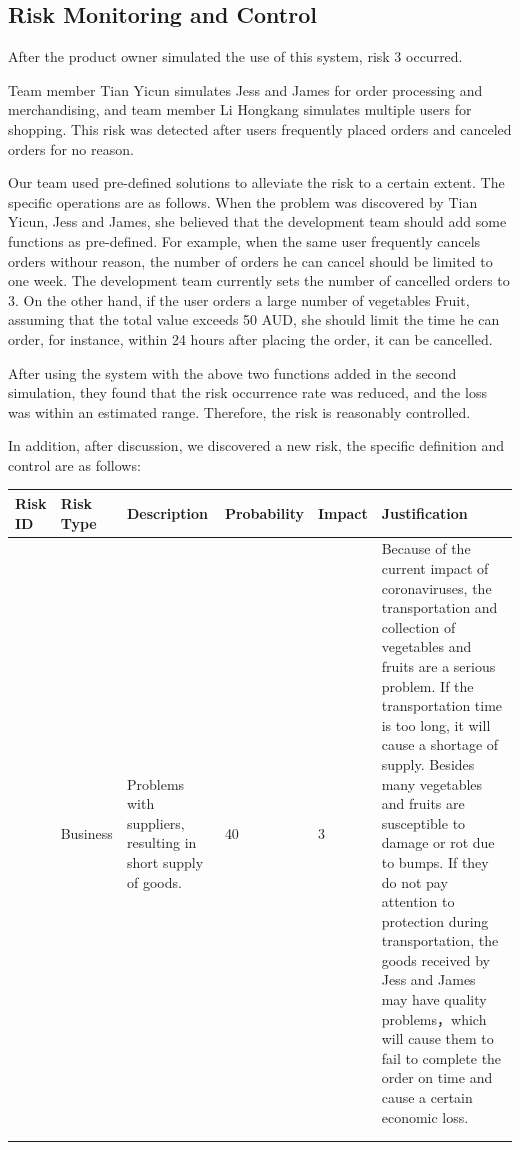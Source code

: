 \clearpage
\subsection{Risk Monitoring and Control}
\label{sub:riskMonitoringandControl2}
After the product owner simulated the use of this system, risk 3 occurred.

Team member Tian Yicun simulates Jess and James for order processing and merchandising, and team member Li Hongkang simulates multiple users for shopping. This risk was detected after users frequently placed orders and canceled orders for no reason.

Our team used pre-defined solutions to alleviate the risk to a certain extent. The specific operations are as follows. When the problem was discovered by Tian Yicun, Jess and James, she believed that the development team should add some functions as pre-defined. For example, when the same user frequently cancels orders withour reason, the number of orders he can cancel should be limited to one week. The development team currently sets the number of cancelled orders to 3. On the other hand, if the user orders a large number of vegetables Fruit, assuming that the total value exceeds 50 AUD, she should limit the time he can order, for instance, within 24 hours after placing the order, it can be cancelled.

After using the system with the above two functions added in the second simulation, they found that the risk occurrence rate was reduced, and the loss was within an estimated range. Therefore, the risk is reasonably controlled.

In addition, after discussion, we discovered a new risk, the specific definition and control are as follows:

\begin{tabularx}{0.95\linewidth}{%
  >{\raggedright\arraybackslash}p{1cm}%
  >{\raggedright\arraybackslash}p{1.2cm}%
  >{\raggedright\arraybackslash}p{2cm}%
  ll%
  >{\raggedright\arraybackslash}X}
  \toprule
  Risk ID & Risk Type & Description & Probability & Impact & Justification\\
  \midrule
  5
  & Business
  & Problems with suppliers, resulting in short supply of goods.
  & 40
  & 3
  & Because of the current impact of coronaviruses, the transportation and collection of vegetables and fruits are a serious problem. If the transportation time is too long, it will cause a shortage of supply. Besides many vegetables and fruits are susceptible to damage or rot due to bumps. If they do not pay attention to protection during transportation, the goods received by Jess and James may have quality problems，which will cause them to fail to complete the order on time and cause a certain economic loss.
  \\
  \bottomrule
  \\
  \label{Risk Monitor 1}
\end{tabularx}


